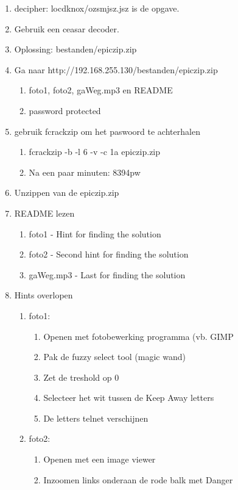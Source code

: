 \begin{enumerate}
  \item decipher: locdknox/ozsmjsz.jsz is de opgave.
  \item Gebruik een ceasar decoder.
  \item Oplossing: bestanden/epiczip.zip
  \item Ga naar http://192.168.255.130/bestanden/epiczip.zip
  	\begin{enumerate}
  	\item foto1, foto2, gaWeg.mp3 en README
  	\item password protected
  	\end{enumerate}
  \item gebruik fcrackzip om het paswoord te achterhalen
  	\begin{enumerate}
  	\item fcrackzip -b -l 6 -v -c 1a epiczip.zip
  	\item Na een paar minuten: 8394pw
  	\end{enumerate}
  \item Unzippen van de epiczip.zip
  \item README lezen
  	\begin{enumerate}
  	\item foto1		   		 - Hint for finding the solution
  	\item foto2              - Second hint for finding the solution
  	\item gaWeg.mp3          - Last for finding the solution
  	\end{enumerate}
  \item Hints overlopen
  	\begin{enumerate}
  	\item foto1:
  		\begin{enumerate}
  		\item Openen met fotobewerking programma (vb. GIMP
  		\item Pak de fuzzy select tool (magic wand)
  		\item Zet de treshold op 0
  		\item Selecteer het wit tussen de Keep Away letters
  		\item De letters telnet verschijnen
  		\end{enumerate}
  	\item foto2:
  		\begin{enumerate}
  		\item Openen met een image viewer
  		\item Inzoomen links onderaan de rode balk met Danger

\end{enumerate}
\end{enumerate}
\end{enumerate}
